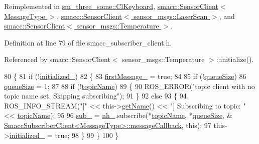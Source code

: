 Reimplemented in \hyperlink{classsm__three__some_1_1ClKeyboard_adbc06c9dc3a4a5b266ff70a4300dcdeb}{sm\+\_\+three\+\_\+some\+::\+Cl\+Keyboard}, \hyperlink{classsmacc_1_1SensorClient_aab9ae52c239305f09cfc4aa48e533ef8}{smacc\+::\+Sensor\+Client$<$ Message\+Type $>$}, \hyperlink{classsmacc_1_1SensorClient_aab9ae52c239305f09cfc4aa48e533ef8}{smacc\+::\+Sensor\+Client$<$ sensor\+\_\+msgs\+::\+Laser\+Scan $>$}, and \hyperlink{classsmacc_1_1SensorClient_aab9ae52c239305f09cfc4aa48e533ef8}{smacc\+::\+Sensor\+Client$<$ sensor\+\_\+msgs\+::\+Temperature $>$}.



Definition at line 79 of file smacc\+\_\+subscriber\+\_\+client.\+h.



Referenced by smacc\+::\+Sensor\+Client$<$ sensor\+\_\+msgs\+::\+Temperature $>$\+::initialize().


\begin{DoxyCode}
80   \{
81     \textcolor{keywordflow}{if} (!\hyperlink{classsmacc_1_1SmaccSubscriberClient_a429baac945d15cb7d997c41c847f5c33}{initialized\_})
82     \{
83       \hyperlink{classsmacc_1_1SmaccSubscriberClient_ad7af631a0b6bdacb76a2532a06ad0a03}{firstMessage\_} = \textcolor{keyword}{true};
84 
85       \textcolor{keywordflow}{if} (!\hyperlink{classsmacc_1_1SmaccSubscriberClient_ac8d4905509ecacb7c93d72c9acb9b6a1}{queueSize})
86         \hyperlink{classsmacc_1_1SmaccSubscriberClient_ac8d4905509ecacb7c93d72c9acb9b6a1}{queueSize} = 1;
87 
88       \textcolor{keywordflow}{if} (!\hyperlink{classsmacc_1_1SmaccSubscriberClient_ac062907e834aa8e4ca7964fe2035edf7}{topicName})
89       \{
90         ROS\_ERROR(\textcolor{stringliteral}{"topic client with no topic name set. Skipping subscribing"});
91       \}
92       \textcolor{keywordflow}{else}
93       \{
94         ROS\_INFO\_STREAM(\textcolor{stringliteral}{"["} << this->\hyperlink{classsmacc_1_1ISmaccClient_a20846aabfd1de832aa27d7a8237a1742}{getName}() << \textcolor{stringliteral}{"] Subscribing to topic: "} << 
      \hyperlink{classsmacc_1_1SmaccSubscriberClient_ac062907e834aa8e4ca7964fe2035edf7}{topicName});
95 
96         \hyperlink{classsmacc_1_1SmaccSubscriberClient_a2a1c46e0ea0a2090a63232402b998518}{sub\_} = \hyperlink{classsmacc_1_1SmaccSubscriberClient_addb62aabc4f81ddac5a151642335ab54}{nh\_}.subscribe(*\hyperlink{classsmacc_1_1SmaccSubscriberClient_ac062907e834aa8e4ca7964fe2035edf7}{topicName}, *\hyperlink{classsmacc_1_1SmaccSubscriberClient_ac8d4905509ecacb7c93d72c9acb9b6a1}{queueSize}, &
      \hyperlink{classsmacc_1_1SmaccSubscriberClient_a4102c06930ea8c7ab3d8c5ed9621ce4e}{SmaccSubscriberClient<MessageType>::messageCallback}, \textcolor{keyword}{
      this});
97         this->\hyperlink{classsmacc_1_1SmaccSubscriberClient_a429baac945d15cb7d997c41c847f5c33}{initialized\_} = \textcolor{keyword}{true};
98       \}
99     \}
100   \}
\end{DoxyCode}


